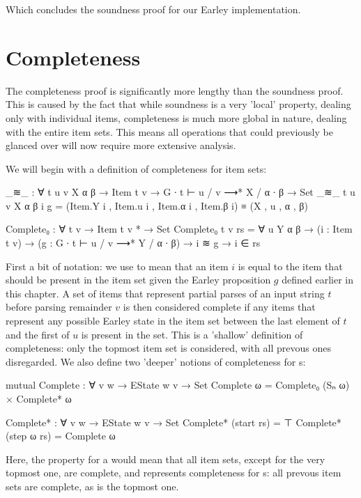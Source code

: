 		Which concludes the soundness proof for our Earley implementation.

	\section{Completeness}

		The completeness proof is significantly more lengthy than the soundness
		proof. This is caused by the fact that while soundness is a very
		'local' property, dealing only with individual items, completeness is
		much more global in nature, dealing with the entire item sets. This
		means all operations that could previously be glanced over will now
		require more extensive analysis.

		We will begin with a definition of completeness for item sets:

		\begin{code}
			_≋_ : ∀ {t u v X α β} → Item t v → G ∙ t ⊢ u / v ⟶* X / α ∙ β → Set
			_≋_ {t} {u} {v} {X} {α} {β} i g =
			  (Item.Y i , Item.u i , Item.α i , Item.β i) ≡ (X , u , α , β)

			Complete₀ : ∀ {t v} → Item t v * → Set
			Complete₀ {t} {v} rs = ∀ {u Y α β} →
			  (i : Item t v) →
			  (g : G ∙ t ⊢ u / v ⟶* Y / α ∙ β) →
			  i ≋ g →
			  i ∈ rs
		\end{code}

		First a bit of notation: we use  to mean that an item $i$
		is equal to the item that should be present in the item set given the
		Earley proposition $g$ defined earlier in this chapter. A set of items
		that represent partial parses of an input string $t$ before parsing
		remainder $v$ is then considered complete if any items that represent
		any possible Earley state in the item set between the last element of
		$t$ and the first of $u$ is present in the set. This is a 'shallow'
		definition of completeness: only the topmost item set is considered,
		with all prevous ones disregarded. We also define two 'deeper' notions of
		completeness for s:

		\begin{code}
			mutual
			  Complete : ∀ {v w} → EState w v → Set
			  Complete ω = Complete₀ (Sₙ ω) × Complete* ω

			  Complete* : ∀ {v w} → EState w v → Set
			  Complete* (start rs) = ⊤
			  Complete* (step ω rs) = Complete ω
		\end{code}

		Here, the  property for a  would mean
		that all item sets, except for the very topmost one, are complete, and
		 represents completeness for s: all
		prevous item sets are complete, as is the topmost one.


